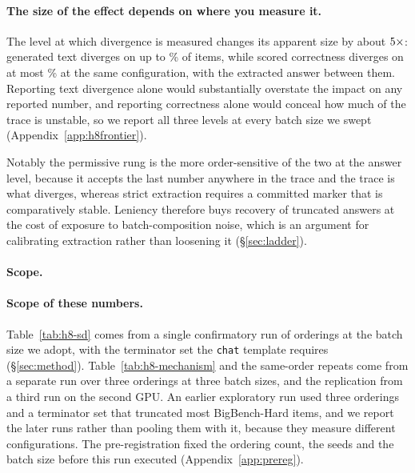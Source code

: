 \documentclass[11pt]{article}
\begin{document}
\paragraph{The size of the effect depends on where you measure it.}
The level at which divergence is measured changes its apparent size by about
$5\times$: generated text diverges on up to
\hEightWorstText\% of items, while scored correctness diverges on at most
\hEightWorstCorr\% at the same configuration, with the extracted answer between
them. Reporting text divergence alone would substantially overstate the impact on
any reported number, and reporting correctness alone would conceal how much of the
trace is unstable, so we report all three levels at every batch size we swept
(Appendix~\ref{app:h8frontier}).

Notably the permissive rung is the more order-sensitive of the two at the
answer level, because it accepts the last number anywhere in the trace and the
trace is what diverges, whereas strict extraction requires a committed marker
that is comparatively stable. Leniency therefore buys recovery of truncated
answers at the cost of exposure to batch-composition noise, which is an
argument for calibrating extraction rather than loosening it
(\S\ref{sec:ladder}).

\paragraph{Scope.}
\paragraph{Scope of these numbers.}
Table~\ref{tab:h8-sd} comes from a single confirmatory run of
\hEightSDOrderings{} orderings at the batch size we adopt, with the terminator set the
\texttt{chat} template requires (\S\ref{sec:method}). Table~\ref{tab:h8-mechanism} and the
same-order repeats come from a separate run over three orderings at three batch sizes, and
the replication from a third run on the second GPU. An earlier exploratory run used
three orderings and a terminator set that truncated most BigBench-Hard items, and we
report the later runs rather than pooling them with it, because they measure different
configurations. The pre-registration fixed the ordering count, the seeds and the batch
size before this run executed (Appendix~\ref{app:prereg}).
\end{document}

